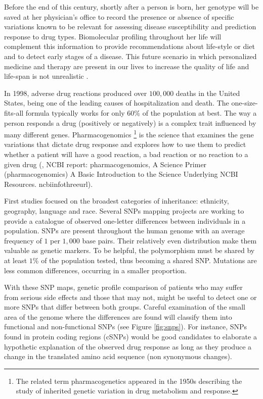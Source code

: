
Before the end of this century, shortly after a person is born, her genotype will be saved at her 
physician's office to record the presence  or absence of specific variations known to be relevant 
for assessing disease susceptibility and prediction response to drug types. Biomolecular profiling 
throughout her life will complement this information to provide recommendations about life-style 
or diet and to detect early stages of a disease. This future scenario in which personalized medicine
and therapy are present in our lives to increase the quality of life and life-span is not 
unrealistic \citep{sander:2000a}. 

In 1998, adverse drug reactions produced over $100,000$ deaths in the United States, being one of the
leading causes of hospitalization and death. The one-size-fits-all formula typically works for only 
$60$\% of the population at best. The way a person responds a drug (positively or negatively) 
is a complex trait influenced by many different genes. Pharmacogenomics \footnote{The related term 
pharmacogenetics appeared in the 1950s describing the study of inherited genetic variation in drug 
metabolism and response.} is the science that examines the gene variations that dictate drug response
and explores how to use them to predict whether a patient will have a good reaction, a bad reaction
or no reaction to a given drug 
(\citealp{evans:1999a}, NCBI report: pharmacogenomics,
    { A Science Primer (pharmacogenomics)}
    {%
      A Basic Introduction to the Science Underlying NCBI Resources.
    }%
    {ncbiinfothreeurl}).

First studies focused on the broadest categories of inheritance: ethnicity, geography, language and
race. Several SNPs mapping projects are working to provide a catalogue of observed 
one-letter differences between individuals in a population. SNPs are present throughout
the human genome with an average frequency of $1$ per $1,000$ base pairs. Their relatively even 
distribution make them valuable as genetic markers. To be helpful, the polymorphism must be shared 
by at least $1$\% of the population tested, thus becoming a shared SNP. Mutations are less
common differences, occurring in a smaller proportion.

With these SNP maps, genetic profile comparison of patients who may suffer from serious side effects 
and those that may not, might be useful to detect one or more SNPs that differ between both groups. Careful 
examination of the small area of the genome where the differences are found will classify them
into functional and non-functional SNPs (see Figure \ref{fig:snps}). 
For instance, SNPs found in 
protein coding regions (cSNPs) would be good candidates to elaborate a hypothetic explanation of
the observed drug response as long as they produce a change in the translated amino acid sequence 
(non synonymous changes).

